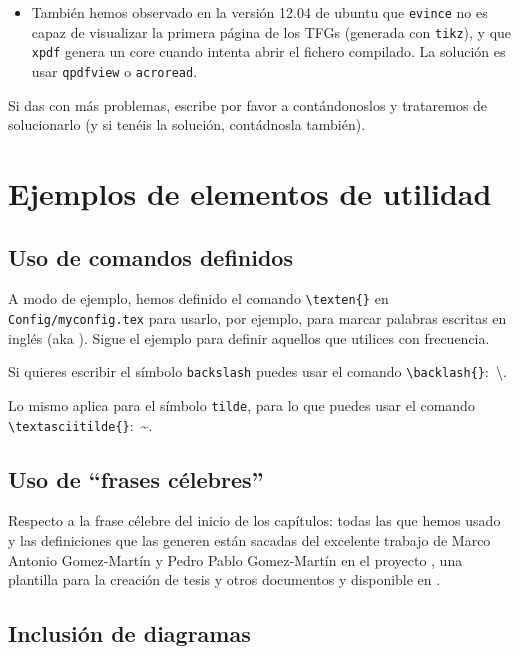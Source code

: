 {\begin{itemize}
    \item También hemos observado en la versión 12.04 de ubuntu que \texttt{evince} no es capaz de visualizar la primera página de los TFGs (generada con \texttt{tikz}), y que \texttt{xpdf} genera un core cuando intenta abrir el fichero compilado. La solución es usar \texttt{qpdfview} o \texttt{acroread}.

  \end{itemize}

  Si das con más problemas, escribe por favor a \contactauthor contándonoslos y trataremos de solucionarlo (y si tenéis la solución, contádnosla también).


  \section{Ejemplos de elementos de utilidad}
  \label{sec:ejempl-de-elem}

  \subsection{Uso de comandos definidos}
  \label{sec:uso-de-comandos}

  A modo de ejemplo, hemos definido el comando \texttt{\textbackslash{}texten\{\}} en \texttt{Config/myconfig.tex} para usarlo, por ejemplo, para marcar palabras escritas en inglés (aka ). Sigue el ejemplo para definir aquellos que utilices con frecuencia.

  Si quieres escribir el símbolo \texttt{backslash} puedes usar el comando \texttt{\textbackslash{}backlash\{\}}:~\textbackslash{}.

  Lo mismo aplica para el símbolo \texttt{tilde}, para lo que puedes usar el comando \texttt{\textbackslash{}textasciitilde\{\}}:~\textasciitilde{}.


  \subsection{Uso de ``frases célebres''}
  \label{sec:uso-de-frases}

  Respecto a la frase célebre del inicio de los capítulos: todas las que hemos usado y las definiciones que las generen están sacadas del excelente trabajo de Marco Antonio Gomez-Martín y Pedro Pablo Gomez-Martín en el proyecto \texis, una plantilla para la creación de tesis y otros documentos y disponible en \cite{texis}.


  \subsection{Inclusión de diagramas}
  \label{sec:diagrama}

}
